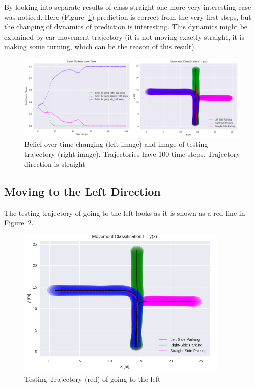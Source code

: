 By looking into separate results of class straight one more very interesting case was noticed. Here (Figure~\ref{fig:InterestingGood}) prediction is correct from the very first steps, but the changing of dynamics of prediction is interesting.  This dynamics might be explained by car movement trajectory (it is not moving exactly straight, it is making some turning, which can be the reason of this result).

\begin{figure}[H]
	\centering  	
	\includegraphics[width=15cm]{img/interesting_straight_tr.jpg}
	\caption{Belief over time changing (left image) and image of testing trajectory (right image). Trajectories have 100 time steps. Trajectory direction is straight}
	\label{fig:InterestingGood}    
\end{figure}

\subsection{Moving to the Left Direction}

The testing trajectory of going to the left looks as it is shown as a red line in Figure~\ref{fig:left}.

\begin{figure}[H]
	\centering  	
	\includegraphics[width=10cm]{img/left_org.jpg}
	\caption{Testing Trajectory (red) of going to the left}
	\label{fig:left}    
\end{figure}

